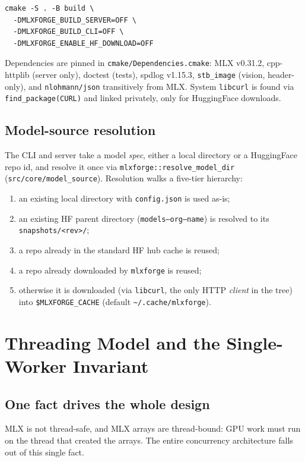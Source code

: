 \documentclass[11pt,a4paper]{report}
\newcommand{\code}[1]{\texttt{#1}}
\begin{document}
\begin{lstlisting}[language=none,caption={Lean library build (no httplib, no curl).}]
cmake -S . -B build \
  -DMLXFORGE_BUILD_SERVER=OFF \
  -DMLXFORGE_BUILD_CLI=OFF \
  -DMLXFORGE_ENABLE_HF_DOWNLOAD=OFF
\end{lstlisting}

Dependencies are pinned in \code{cmake/Dependencies.cmake}: MLX v0.31.2,
cpp-httplib (server only), doctest (tests), spdlog v1.15.3, \code{stb\_image}
(vision, header-only), and \code{nlohmann/json} transitively from MLX. System
\code{libcurl} is found via \code{find\_package(CURL)} and linked privately, only
for HuggingFace downloads.

\section{Model-source resolution}
The CLI and server take a model \emph{spec}, either a local directory or a
HuggingFace repo id, and resolve it once via
\code{mlxforge::resolve\_model\_dir} (\code{src/core/model\_source}). Resolution
walks a five-tier hierarchy:
\begin{enumerate}[nosep]
  \item an existing local directory with \code{config.json} is used as-is;
  \item an existing HF parent directory (\code{models--org--name}) is resolved to
        its \code{snapshots/<rev>/};
  \item a repo already in the standard HF hub cache is reused;
  \item a repo already downloaded by \code{mlxforge} is reused;
  \item otherwise it is downloaded (via \code{libcurl}, the only HTTP \emph{client}
        in the tree) into \code{\$MLXFORGE\_CACHE} (default
        \code{\textasciitilde/.cache/mlxforge}).
\end{enumerate}

\chapter{Threading Model and the Single-Worker Invariant}
\label{ch:threading}

\section{One fact drives the whole design}
MLX is not thread-safe, and MLX arrays are thread-bound: GPU work must run on the
thread that created the arrays. The entire concurrency architecture falls out of
this single fact.
\end{document}
